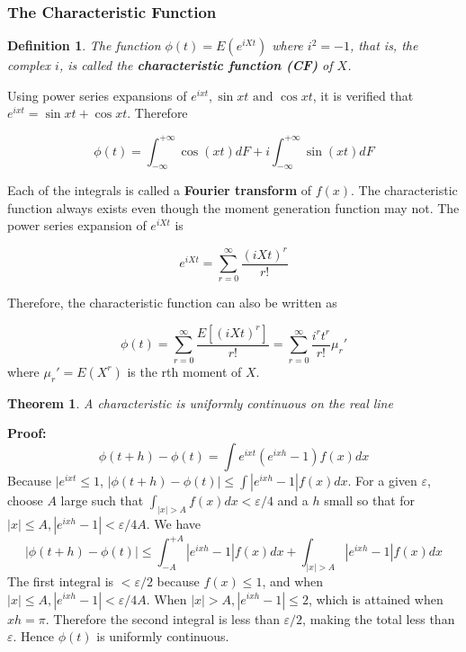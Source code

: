 \documentclass{article}
\newtheorem{definition}{Definition}[section]
\newtheorem{theorem}{Theorem}[section]
\begin{document}
\subsubsection{The Characteristic Function}

\begin{definition}
    The function \(\phi(t)=E(e^{iXt})\) where \(i^2=-1\), that is, the complex \(i\), is called the \textbf{characteristic function (CF)} of \(X\).
\end{definition}

Using power series expansions of \(e^{ixt},\sin{xt} \text{ and } \cos{xt}\), it is verified that \(e^{ixt}=\sin{xt} + \cos{xt}\). Therefore

\begin{equation*}
    \phi(t)= \int_{- \infty}^{+ \infty} \cos{(xt)} dF + i  \int_{- \infty}^{+ \infty} \sin{(xt)} dF
\end{equation*}

Each of the integrals is called a \textbf{Fourier transform} of \(f(x)\). The characteristic function always exists even though the moment generation function may not. The power series expansion of \(e^{iXt}\) is

\begin{equation*}
    e^{iXt}=\sum_{r=0}^{\infty} \frac{(iXt)^r}{r!}
\end{equation*}

Therefore, the characteristic function can also be written as

\begin{equation*}
    \phi(t)=\sum_{r=0}^{\infty} \frac{E[(iXt)^r]}{r!} = \sum_{r=0}^{\infty} \frac{i^r t^r}{r!} \mu_r'
\end{equation*}
where \(\mu_r'=E(X^r)\) is the rth moment of \(X\).

\begin{theorem}
    A characteristic is uniformly continuous on the real line
\end{theorem}

\textbf{Proof:} 
\begin{equation*}
    \phi(t+h)-\phi(t)=\int e^{ixt} (e^{ixh}-1) f(x) dx
\end{equation*}
Because \(|e^{ixt} \leq 1\), \(|\phi(t+h)-\phi(t)| \leq \int |e^{ixh}-1| f(x) dx\). For a given \(\varepsilon\), choose \(A\) large such that \(\int_{|x|>A}f(x)dx < \varepsilon/4\) and a \(h\) small so that for \(|x| \leq A, |e^{ixh}-1| < \varepsilon/4A\). We have
\begin{equation*}
    |\phi(t+h)-\phi(t)| \leq \int_{-A}^{+A} |e^{ixh}-1|f(x)dx + \int_{|x|>A} |e^{ixh}-1| f(x) dx
\end{equation*}
The first integral is \(< \varepsilon/2\) because \(f(x) \leq 1\), and when \(|x| \leq A, |e^{ixh}-1| < \varepsilon/4A\). When \(|x|>A, |e^{ixh}-1| \leq 2\), which is attained when \(xh=\pi\). Therefore the second integral is less than \(\varepsilon/2\), making the total less than \(\varepsilon\). Hence \(\phi(t)\) is uniformly continuous.
\end{document}
